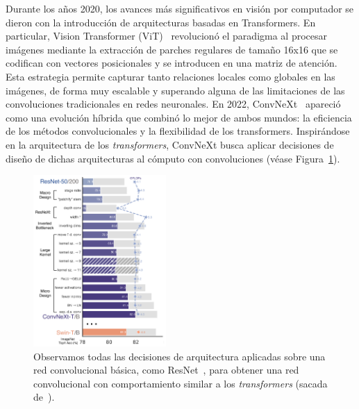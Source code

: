 \documentclass[12pt,letterpaper]{article}
\begin{document}
Durante los años 2020, los avances más significativos en visión por computador se dieron con la introducción de arquitecturas basadas en Transformers. 
En particular, Vision Transformer (ViT)~\cite{VIT} revolucionó el paradigma al procesar imágenes mediante la extracción de 
parches regulares de tamaño 16x16 que se codifican con vectores posicionales y se introducen en una matriz de atención. 
Esta estrategia permite capturar tanto relaciones locales como globales en las imágenes, de forma muy escalable y superando alguna de las limitaciones 
de las convoluciones tradicionales en redes neuronales. En 2022, ConvNeXt~\cite{ConvNext} apareció como una evolución híbrida que combinó lo mejor de ambos mundos: la eficiencia de los métodos convolucionales y la flexibilidad de los transformers. 
Inspirándose en la arquitectura de los \textit{transformers}, ConvNeXt busca aplicar decisiones de diseño de dichas arquitecturas al cómputo con convoluciones (véase Figura~\ref{fig:ConvNext}). 

\begin{figure}[!ht]
\begin{center}
    \includegraphics[width=0.45\textwidth]{ConvNext.png}
\end{center}
\caption{Observamos todas las decisiones de arquitectura aplicadas sobre una red convolucional básica, como ResNet~\cite{ResNet}, para obtener una red convolucional con comportamiento similar a los \textit{transformers} (sacada de~\cite{ConvNext}).}
\label{fig:ConvNext}
\end{figure}
\end{document}
